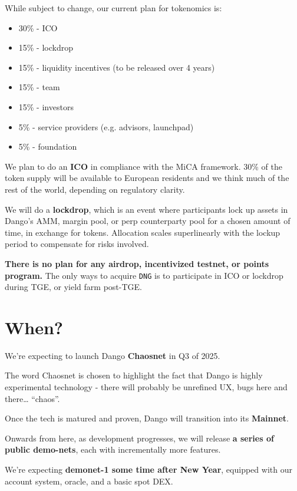 \documentclass{article}
\newcommand{\image}[2]{%
  \begin{center}
    \makebox[\textwidth]{ \texttt{[image: \#1]}}%
  \end{center}
  \begin{center}
    \captionsetup{type=figure}
    \captionof{figure}{#2}
  \end{center}
}
\begin{document}
While subject to change, our current plan for tokenomics is:

\begin{itemize}
  \item 30\% - ICO
  \item 15\% - lockdrop
  \item 15\% - liquidity incentives (to be released over 4 years)
  \item 15\% - team
  \item 15\% - investors
  \item 5\% - service providers (e.g. advisors, launchpad)
  \item 5\% - foundation
\end{itemize}

\image{images/10-tokenomics.jpeg}{Tokenomics}

\image{images/11-timeline.jpeg}{Timeline}

We plan to do an \textbf{ICO} in compliance with the MiCA framework. 30\% of the token supply will be available to European residents and we think much of the rest of the world, depending on regulatory clarity.

We will do a \textbf{lockdrop}, which is an event where participants lock up assets in Dango's AMM, margin pool, or perp counterparty pool for a chosen amount of time, in exchange for tokens. Allocation scales superlinearly with the lockup period to compensate for risks involved.

\textbf{There is no plan for any airdrop, incentivized testnet, or points program.} The only ways to acquire \texttt{DNG} is to participate in ICO or lockdrop during TGE, or yield farm post-TGE.

\section{When?}

We're expecting to launch Dango \textbf{Chaosnet} in Q3 of 2025.

The word Chaosnet is chosen to highlight the fact that Dango is highly experimental technology - there will probably be unrefined UX, bugs here and there… ``chaos''.

Once the tech is matured and proven, Dango will transition into its \textbf{Mainnet}.

Onwards from here, as development progresses, we will release \textbf{a series of public demo-nets}, each with incrementally more features.

We're expecting \textbf{demonet-1 some time after New Year}, equipped with our account system, oracle, and a basic spot DEX.
\end{document}
